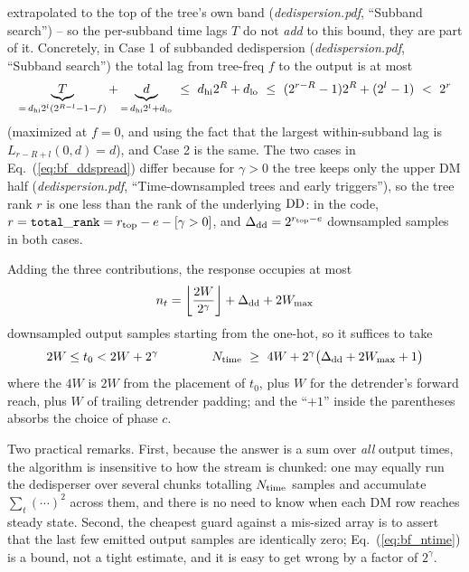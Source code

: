 \documentclass{article}
\numberwithin{equation}{section}   %
\def\DD{{\rm DD}}
\newcommand{\ddnotes}[1]{{\em dedispersion.pdf}, ``#1''}
\begin{document}
extrapolated to the top of the tree's own band (\ddnotes{Subband search}) -- so the per-subband
time lags $T$ do not {\em add} to this bound, they are part of it. Concretely, in Case 1 of
subbanded dedispersion (\ddnotes{Subband search}) the total lag from tree-freq $f$ to the
output is at most
\begin{equation}
\underbrace{T}_{= \, d_{\rm hi}2^l(2^{R-l}-1-f)} + \underbrace{d}_{= \, d_{\rm hi}2^l + d_{\rm lo}}
\ \le \ d_{\rm hi} 2^R + d_{\rm lo} \ \le \ (2^{r-R}-1)2^R + (2^l-1) \ < \ 2^r
\end{equation}
(maximized at $f=0$, and using the fact that the largest within-subband lag is
$L_{r-R+l}(0,d) = d$), and Case 2 is the same. The two cases in Eq.\ (\ref{eq:bf_ddspread}) differ
because for $\gamma>0$ the tree keeps only the upper DM half (\ddnotes{Time-downsampled trees and early triggers}), so
the tree rank $r$ is one less than the rank of the underlying $\DD$: in the code,
$r = {\tt total\_rank} = r_{\rm top} - e - [\gamma>0]$, and $\Delta_{\rm dd} = 2^{r_{\rm top}-e}$
downsampled samples in both cases.

Adding the three contributions, the response occupies at most
\begin{equation}
n_t = \left\lfloor \frac{2W}{2^\gamma} \right\rfloor + \Delta_{\rm dd} + 2 W_{\rm max}
\end{equation}
downsampled output samples starting from the one-hot, so it suffices to take
\begin{equation}
2W \le t_0 < 2W + 2^\gamma
  \hspace{1.5cm}
N_{\rm time} \ \ge \ 4W + 2^\gamma \big( \Delta_{\rm dd} + 2W_{\rm max} + 1 \big)
\label{eq:bf_ntime}
\end{equation}
where the $4W$ is $2W$ from the placement of $t_0$, plus $W$ for the detrender's forward reach,
plus $W$ of trailing detrender padding; and the ``$+1$'' inside the parentheses absorbs the choice
of phase $c$.

Two practical remarks. First, because the answer is a sum over {\em all} output times, the
algorithm is insensitive to how the stream is chunked: one may equally run the dedisperser over
several chunks totalling $N_{\rm time}$ samples and accumulate $\sum_t(\cdots)^2$ across them, and
there is no need to know when each DM row reaches steady state. Second, the cheapest guard against
a mis-sized array is to assert that the last few emitted output samples are identically zero;
Eq.\ (\ref{eq:bf_ntime}) is a bound, not a tight estimate, and it is easy to get wrong by a factor
of $2^\gamma$.
\end{document}
